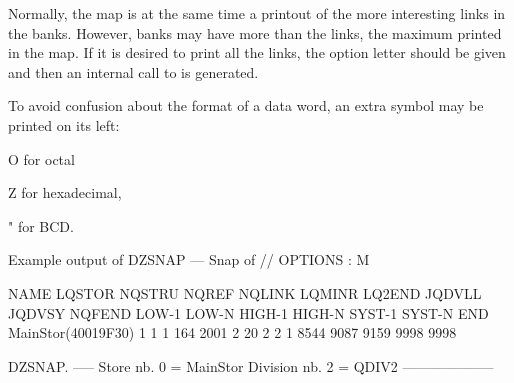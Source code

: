 Normally, the map is at the same time a printout of the more
interesting links in the banks.
However, banks may have more than the  links, the maximum printed in the map.
If it is desired to print all the links,
the option letter  should be given and
then an internal  call to  is generated.

To avoid confusion about the format of a data word,
an extra symbol may be printed on its left:
\begin{DLttc}{12}
\item[O]for octal
\item[Z]for hexadecimal,
\item["]for BCD.
\end{DLttc}

\newpage
\begin{Listing}{Example output of }
DZSNAP --- Snap of //                                                                              OPTIONS : M                   
                                                                                                                                 
  NAME       LQSTOR NQSTRU  NQREF NQLINK LQMINR LQ2END JQDVLL JQDVSY NQFEND  LOW-1  LOW-N HIGH-1 HIGH-N SYST-1 SYST-N    END     
 MainStor(40019F30)      1      1      1    164   2001      2     20      2      2      1   8544   9087   9159   9998   9998     
                                                                                                                                 
DZSNAP.   -----  Store nb. 0 = MainStor Division nb. 2 = QDIV2                       --------------------                        
                                                                                                                                 

\end{Listing}
